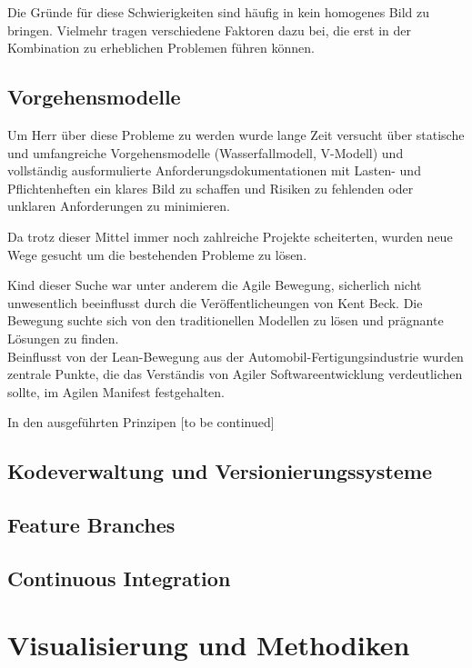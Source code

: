 \documentclass[10pt,a4paper]{book}
\begin{document}
Die Gründe für diese Schwierigkeiten sind häufig in kein homogenes Bild zu bringen. Vielmehr tragen verschiedene Faktoren dazu bei, die erst in der Kombination zu erheblichen Problemen führen können.

\section{Vorgehensmodelle}

Um Herr über diese Probleme zu werden wurde lange Zeit versucht über statische und umfangreiche Vorgehensmodelle (Wasserfallmodell, V-Modell) und vollständig ausformulierte Anforderungsdokumentationen mit Lasten- und Pflichtenheften ein klares Bild zu schaffen und Risiken zu fehlenden oder unklaren Anforderungen zu minimieren.

Da trotz dieser Mittel immer noch zahlreiche Projekte scheiterten, wurden neue Wege gesucht um die bestehenden Probleme zu lösen.

Kind dieser Suche war unter anderem die Agile Bewegung, sicherlich nicht unwesentlich beeinflusst durch die Veröffentlicheungen von Kent Beck. Die Bewegung suchte sich von den traditionellen Modellen zu lösen und prägnante Lösungen zu finden.\\
Beinflusst von der Lean-Bewegung aus der Automobil-Fertigungsindustrie wurden zentrale Punkte, die das Verständis von Agiler Softwareentwicklung verdeutlichen sollte, im Agilen Manifest festgehalten.

In den ausgeführten Prinzipen [to be continued]

\section{Kodeverwaltung und Versionierungssysteme}

\section{Feature Branches}

\section{Continuous Integration}

\chapter{Visualisierung und Methodiken}
\end{document}
